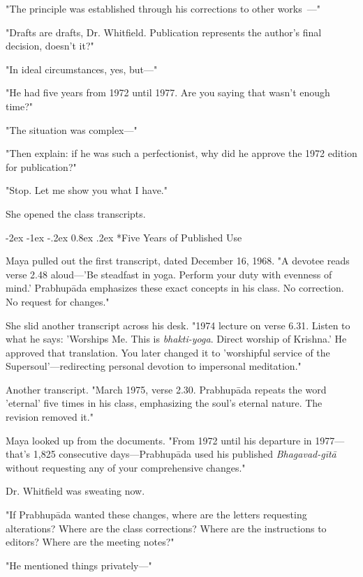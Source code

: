 \documentclass[12pt,twoside]{book}
\makeatletter
\let\oldsubsection\subsection
\renewcommand{\subsection}[1]{\needspace{3\baselineskip}\oldsubsection{#1}}
\renewcommand\subsection{\@startsection{subsection}{2}{\z@}%
{-2ex \@plus -1ex \@minus -.2ex}%
{0.8ex \@plus .2ex}%
{\normalfont\large\bfseries}}
\makeatother
\begin{document}
"The principle was established through his corrections to other works~—"

"Drafts are drafts, Dr. Whitfield. Publication represents the author's final decision, doesn't it?"

"In ideal circumstances, yes, but—"

"He had five years from 1972 until 1977. Are you saying that wasn't enough time?"

"The situation was complex—"

"Then explain: if he was such a perfectionist, why did he approve the 1972 edition for publication?"

"Stop. Let me show you what I have."

She opened the class transcripts.

\vspace{0.1cm}
\subsection*{Five Years of Published Use}

Maya pulled out the first transcript, dated December 16, 1968. "A devotee reads verse 2.48 aloud—'Be steadfast in yoga. Perform your duty with evenness of mind.' Prabhupāda emphasizes these exact concepts in his class. No correction. No request for changes."

She slid another transcript across his desk. "1974 lecture on verse 6.31. Listen to what he says: 'Worships Me. This is \emph{bhakti-yoga}. Direct worship of Krishna.' He approved that translation. You later changed it to 'worshipful service of the Supersoul'—redirecting personal devotion to impersonal meditation."

Another transcript. "March 1975, verse 2.30. Prabhupāda repeats the word 'eternal' five times in his class, emphasizing the soul's eternal nature. The revision removed it."

Maya looked up from the documents. "From 1972 until his departure in 1977—that's 1,825 consecutive days—Prabhupāda used his published \emph{Bhagavad-gītā} without requesting any of your comprehensive changes."

Dr. Whitfield was sweating now.

"If Prabhupāda wanted these changes, where are the letters requesting alterations? Where are the class corrections? Where are the instructions to editors? Where are the meeting notes?"

"He mentioned things privately—"
\end{document}

